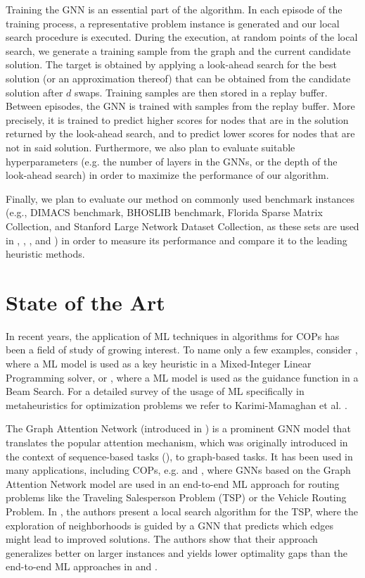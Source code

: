 \documentclass[11pt]{article}
\begin{document}
Training the GNN is an essential part of the algorithm. In each episode of the training process, a representative problem instance is generated and our local search procedure is executed. During the execution, at random points of the local search, we generate a training sample from the graph and the current candidate solution. The target is obtained by applying a look-ahead search for the best solution (or an approximation thereof) that can be obtained from the candidate solution after $d$ swaps. Training samples are then stored in a replay buffer. Between episodes, the GNN is trained with samples from the replay buffer. More precisely, it is trained to predict higher scores for nodes that are in the solution returned by the look-ahead search, and to predict lower scores for nodes that are not in said solution. Furthermore, we also plan to evaluate suitable hyperparameters (e.g. the number of layers in the GNNs, or the depth of the look-ahead search) in order to maximize the performance of our algorithm. 

Finally, we plan to evaluate our method on commonly used benchmark instances (e.g., DIMACS benchmark, BHOSLIB benchmark, Florida Sparse Matrix Collection, and Stanford Large Network Dataset Collection, as these sets are used in \cite{djeddi_extension_2019}, \cite{pinto_biased_2018}, \cite{chen_nuqclq_2021}, and \cite{zhou_opposition-based_2020}) in order to measure its performance and compare it to the leading heuristic methods. 

\section{State of the Art}

In recent years, the application of ML techniques in algorithms for COPs has been a field of study of growing interest. To name only a few examples, consider \cite{Zarpellon2021}, where a ML model is used as a key heuristic in a Mixed-Integer Linear Programming solver, or \cite{Huber2021}, where a ML model is used as the guidance function in a Beam Search. For a detailed survey of the usage of ML specifically in metaheuristics for optimization problems we refer to Karimi-Mamaghan et al. \cite{KARIMIMAMAGHAN2022393}. 

 The Graph Attention Network (introduced in \cite{Velickovic2018}) is a prominent GNN model that translates the popular attention mechanism, which was originally introduced in the context of sequence-based tasks (\cite{Bahdanau2015}), to graph-based tasks. It has been used in many applications, including COPs, e.g. \cite{Kool2019} and \cite{Joshi2021}, where GNNs based on the Graph Attention Network model are used in an end-to-end ML approach for routing problems like the Traveling Salesperson Problem (TSP) or the Vehicle Routing Problem. In \cite{Hudson2021}, the authors present a local search algorithm for the TSP, where the exploration of neighborhoods is guided by a GNN that predicts which edges might lead to improved solutions. The authors show that their approach generalizes better on larger instances and yields lower optimality gaps than the end-to-end ML approaches in \cite{Kool2019} and \cite{Joshi2021}.  
\end{document}
